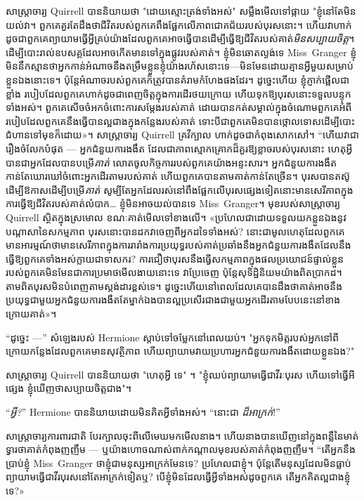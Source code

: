 {{សាស្រ្តាចារ្យ Quirrell បាននិយាយថា "ដោយស្មោះត្រង់ទាំងអស់" សម្លឹងមើលទៅផ្កាយ "ខ្ញុំនៅតែមិនយល់វា។ ពួកគេគួរតែដឹងថាជីវិតរបស់ពួកគេពឹងផ្អែកលើភាពជោគជ័យរបស់បុរសនោះ។ ហើយវាហាក់ដូចជាពួកគេព្យាយាមធ្វើអ្វីគ្រប់យ៉ាងដែលពួកគេអាចធ្វើបានដើម្បីធ្វើឱ្យជីវិតរបស់គាត់\emph{មិនសប្បាយចិត្ត}។ ដើម្បីបោះរាល់ឧបសគ្គដែលអាចកើតមានទៅក្នុងផ្លូវរបស់គាត់។ ខ្ញុំមិនឆោតល្ងង់ទេ Miss~Granger ខ្ញុំមិននឹកស្មានថាអ្នកកាន់អំណាចនឹងតម្រឹមខ្លួនខ្ញុំយ៉ាងរហ័សនោះទេ—មិនមែនដោយគ្មានអ្វីមួយសម្រាប់ខ្លួនឯងនោះទេ។ ប៉ុន្តែអំណាចរបស់ពួកគេក៏ត្រូវបានគំរាមកំហែងផងដែរ។ ដូច្នេះហើយ ខ្ញុំភ្ញាក់ផ្អើលជាខ្លាំង របៀបដែលពួកគេហាក់ដូចជាពេញចិត្តក្នុងការដើរថយក្រោយ ហើយទុកឱ្យបុរសនោះទទួលបន្ទុកទាំងអស់។ ពួកគេ​សើចចំអក​ចំពោះ​ការ​សម្តែង​របស់​គាត់ ដោយ​បាន​កត់សម្គាល់​ក្នុង​ចំណោម​ពួកគេ​អំពី​របៀប​ដែល​ពួកគេ​នឹង​ធ្វើ​បាន​ល្អ​ជាង​ក្នុង​កន្លែង​របស់​គាត់ ទោះបីជា​ពួកគេ​មិន​បាន​ថ្កោលទោស​ដើម្បី​បោះ​ជំហាន​ទៅ​មុខ​ក៏ដោយ​»។ សាស្ត្រាចារ្យ Quirrell គ្រវីក្បាល ហាក់ដូចជាកំពុងសោកសៅ។ “ហើយវាជារឿងចំលែកបំផុត — អ្នកជំនួយការងងឹត ដែលជាភាពស្មោកគ្រោកដ៏គួរឱ្យខ្លាចរបស់បុរសនោះ ហេតុអ្វីបានជាអ្នកដែលបានបម្រើ\emph{គាត់} លោតចូលកិច្ចការរបស់ពួកគេយ៉ាងអន្ទះសារ។ អ្នកជំនួយការងងឹតកាន់តែឃោរឃៅចំពោះអ្នកដើរតាមរបស់គាត់ ហើយពួកគេបានតាមគាត់កាន់តែច្រើន។ បុរសបានតស៊ូដើម្បីឱកាសដើម្បីបម្រើ\emph{គាត់} សូម្បីតែអ្នកដែលរស់នៅពឹងផ្អែកលើបុរសផ្សេងទៀតនោះមានសេរីភាពក្នុងការធ្វើឱ្យជីវិតរបស់គាត់លំបាក… ខ្ញុំមិនអាចយល់បានទេ Miss~Granger។ មុខរបស់សាស្រ្តាចារ្យ Quirrell ស្ថិតក្នុងស្រមោល ខណៈគាត់មើលទៅខាងលើ។ «ប្រហែលជាដោយទទួលយកខ្លួនឯងនូវបណ្តាសានៃសកម្មភាព បុរសនោះបានដកវាចេញពីអ្នកដទៃទាំងអស់? នោះជាមូលហេតុដែលពួកគេមានអារម្មណ៍ថាមានសេរីភាពក្នុងការរារាំងការប្រយុទ្ធរបស់គាត់ប្រឆាំងនឹងអ្នកជំនួយការងងឹតដែលនឹងធ្វើឱ្យពួកគេទាំងអស់ក្លាយជាទាសករ? ការជឿថាបុរសនឹងធ្វើសកម្មភាពក្នុងផលប្រយោជន៍ផ្ទាល់ខ្លួនរបស់ពួកគេមិនមែនជាការប្រមាថមើលងាយនោះទេ វាប្រែចេញ ប៉ុន្តែសុទិដ្ឋិនិយមយ៉ាងពិតប្រាកដ។ តាមពិតបុរសមិនបំពេញតាមស្តង់ដារខ្ពស់ទេ។ ដូច្នេះ​ហើយ​នៅ​ពេល​ដែល​គេ​បាន​ដឹង​ថា​គាត់​អាច​នឹង​ប្រយុទ្ធ​ជាមួយ​អ្នក​ជំនួយ​ការ​ងងឹត​តែ​ម្នាក់​ឯង​បាន​ល្អ​ប្រសើរ​ជាង​ជាមួយ​អ្នក​ដើរ​តាម​បែប​នេះ​នៅ​ខាង​ក្រោយ​គាត់»។

“ដូច្នេះ —” សំឡេងរបស់ Hermione ស្តាប់ទៅចម្លែកនៅពេលយប់។ "អ្នកទុកមិត្តរបស់អ្នកនៅពីក្រោយកន្លែងដែលពួកគេមានសុវត្ថិភាព ហើយព្យាយាមវាយប្រហារអ្នកជំនួយការងងឹតដោយខ្លួនឯង?"

សាស្រ្តាចារ្យ Quirrell បាននិយាយថា "ហេតុអ្វី ទេ" ។ "ខ្ញុំឈប់ព្យាយាមធ្វើជាវីរៈបុរស ហើយទៅធ្វើអីផ្សេង ខ្ញុំឃើញថាសប្បាយចិត្តជាង"។

“\emph{អ្វី?}” Hermione បាននិយាយដោយមិនគិតអ្វីទាំងអស់។ “នោះជា \emph{ដ៏អាក្រក់}!”

សាស្ត្រាចារ្យការពារជាតិ បែរក្បាលចុះពីលើមេឃមកមើលនាង។ ហើយនាងបានឃើញនៅក្នុងពន្លឺនៃមាត់ទ្វារថាគាត់កំពុងញញឹម — ឬយ៉ាងហោចណាស់ពាក់កណ្តាលមុខរបស់គាត់កំពុងញញឹម។ “តើអ្នកនឹងប្រាប់ខ្ញុំ Miss~Granger ថាខ្ញុំជាមនុស្សអាក្រក់មែនទេ? ប្រហែលជាខ្ញុំ។ ប៉ុន្តែ​តើ​មនុស្ស​ដែល​មិន​ធ្លាប់​ព្យាយាម​ធ្វើ​ជា​វីរបុរស​នៅ​តែ​អាក្រក់​ទៀត​ឬ? បើ​ខ្ញុំ​មិន​ដែល​ធ្វើ​អ្វី​ទាំង​អស់​ដូច​ពួក​គេ តើ​អ្នក​គិត​ល្អ​ជាង​ខ្ញុំ​ទេ?»

}}
